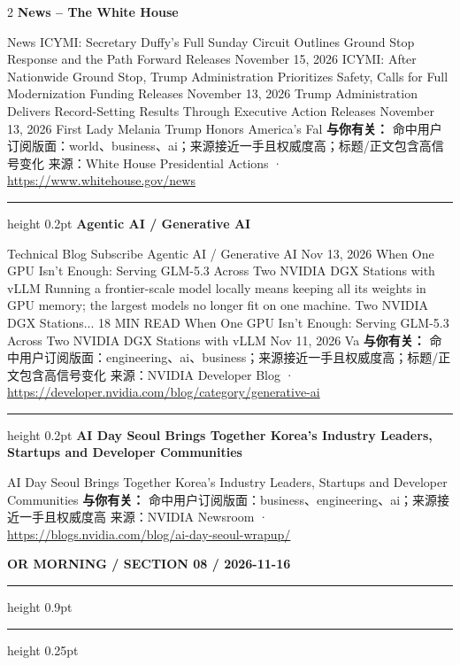 \documentclass[10.5pt]{ctexart}
\begin{document}
\begin{multicols}{2}
{\large\bfseries News – The White House}\par
News ICYMI: Secretary Duffy’s Full Sunday Circuit Outlines Ground Stop Response and the Path Forward Releases November 15, 2026 ICYMI: After Nationwide Ground Stop, Trump Administration Prioritizes Safety, Calls for Full Modernization Funding Releases November 13, 2026 Trump Administration Delivers Record-Setting Results Through Executive Action Releases November 13, 2026 First Lady Melania Trump Honors America’s Fal
\textbf{与你有关：} 命中用户订阅版面：world、business、ai；来源接近一手且权威度高；标题/正文包含高信号变化
{\footnotesize\color{ormuted} 来源：White House Presidential Actions · \url{https://www.whitehouse.gov/news}}
\vspace{2mm}
\hrule height 0.2pt
\vspace{2mm}
{\large\bfseries Agentic AI / Generative AI}\par
Technical Blog Subscribe Agentic AI / Generative AI Nov 13, 2026 When One GPU Isn’t Enough: Serving GLM-5.3 Across Two NVIDIA DGX Stations with vLLM Running a frontier-scale model locally means keeping all its weights in GPU memory; the largest models no longer fit on one machine. Two NVIDIA DGX Stations... 18 MIN READ When One GPU Isn’t Enough: Serving GLM-5.3 Across Two NVIDIA DGX Stations with vLLM Nov 11, 2026 Va
\textbf{与你有关：} 命中用户订阅版面：engineering、ai、business；来源接近一手且权威度高；标题/正文包含高信号变化
{\footnotesize\color{ormuted} 来源：NVIDIA Developer Blog · \url{https://developer.nvidia.com/blog/category/generative-ai}}
\vspace{2mm}
\hrule height 0.2pt
\vspace{2mm}
{\large\bfseries AI Day Seoul Brings Together Korea’s Industry Leaders, Startups and Developer Communities}\par
AI Day Seoul Brings Together Korea’s Industry Leaders, Startups and Developer Communities
\textbf{与你有关：} 命中用户订阅版面：business、engineering、ai；来源接近一手且权威度高
{\footnotesize\color{ormuted} 来源：NVIDIA Newsroom · \url{https://blogs.nvidia.com/blog/ai-day-seoul-wrapup/}}
\end{multicols}
\newpage
{\small\bfseries OR MORNING / SECTION 08 / 2026-11-16}
\vspace{2mm}
\hrule height 0.9pt
\vspace{1.5mm}
\hrule height 0.25pt
\vspace{4mm}
\end{document}
